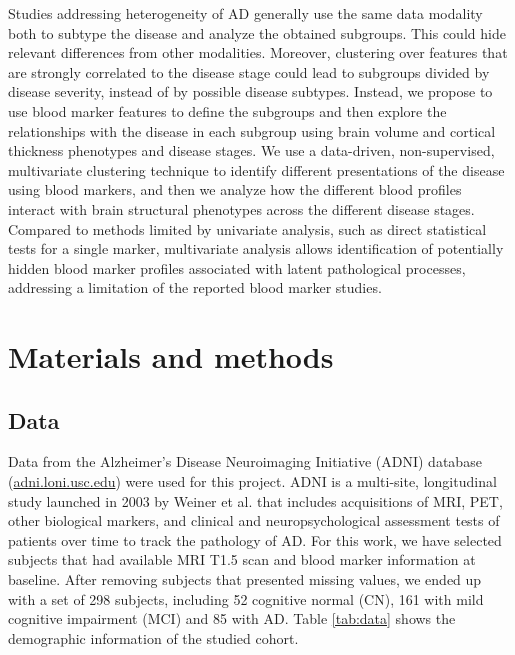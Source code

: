Studies addressing heterogeneity of AD generally use the same data modality both to subtype the disease and analyze the obtained subgroups. This could hide relevant differences from other modalities. Moreover, clustering over features that are strongly correlated to the disease stage could lead to subgroups divided by disease severity, instead of by possible disease subtypes. Instead, we propose to use blood marker features to define the subgroups and then explore the relationships with the disease in each subgroup using brain volume and cortical thickness phenotypes and disease stages. We use a data-driven, non-supervised, multivariate clustering technique \cite{Ramazzotti2018} to identify different presentations of the disease using blood markers, and then we analyze how the different blood profiles interact with brain structural phenotypes across the different disease stages. Compared to methods limited by univariate analysis, such as direct statistical tests for a single marker, multivariate analysis allows identification of potentially hidden blood marker profiles associated with latent pathological processes, addressing a limitation of the reported blood marker studies. \\


\section{Materials and methods}
\subsection*{Data}
\label{data}

Data from the Alzheimer's Disease Neuroimaging Initiative (ADNI) database (\url{adni.loni.usc.edu}) were used for this project. ADNI is a multi-site, longitudinal study launched in 2003 by Weiner et al. \cite{Mueller2005} that includes acquisitions of MRI, PET, other biological markers, and clinical and neuropsychological assessment tests of patients over time to track the pathology of AD. For this work, we have selected subjects that had available  MRI T1.5 scan and blood marker information at baseline. After removing subjects that presented missing values, we ended up with a set of 298 subjects, including 52 cognitive normal (CN), 161 with mild cognitive impairment (MCI) and 85 with AD. Table \ref{tab:data} shows the demographic information of the studied cohort. \\

